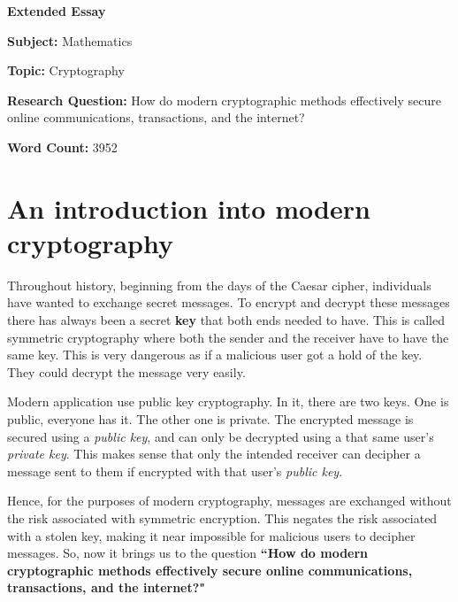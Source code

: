 \documentclass[a4paper,12pt]{article}
\theoremstyle{definition}
\begin{document}
\begin{titlepage}
    \begin{center}
    
        \vspace*{1cm}
 
        \Large
        \textbf{Extended Essay}

        
 		\textbf{Subject:} Mathematics
        \vspace{0.2cm}
        
        \textbf{Topic:} Cryptography
        \vspace{2.5cm}
		
		
		\textbf{Research Question: }How do modern cryptographic methods effectively secure online communications, transactions, and the internet?
 
        \vfill
 
 
        \vspace{0.8cm}
 
 
        \Large
       \textbf{Word Count: }3952 
 
    \end{center}
\end{titlepage}



\tableofcontents


\newpage
\section{An introduction into modern cryptography}


\indent Throughout history, beginning from the days of the Caesar cipher, individuals have wanted to exchange secret messages. To encrypt and decrypt these messages there has always been a secret \textbf{key} that both ends needed to have. This is called symmetric cryptography where both the sender and the receiver have to have the same key. This is very dangerous as if a malicious user got a hold of the key. They could decrypt the message very easily.

Modern application use  public key cryptography. In it, there are two keys. One is public, everyone has it. The other one is private. The encrypted message is secured using a \textit{public key}, and can only be decrypted using a that same user's \textit{private key}. This makes sense that only the intended receiver can decipher a message sent to them if encrypted with that user's \textit{public key}.

Hence, for the purposes of modern cryptography, messages are exchanged without the risk associated with symmetric encryption. This negates the risk associated with a stolen key, making it near impossible for malicious users to decipher messages. So, now it brings us to the question \textbf{``How do modern cryptographic methods effectively secure online communications, transactions, and the internet?"}
\end{document}
